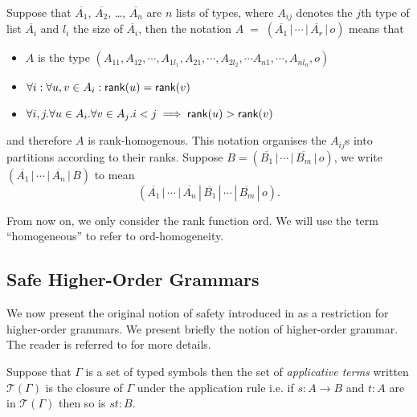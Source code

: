Suppose that $\overline{A_1}$, $\overline{A_2}$, \ldots,
$\overline{A_n}$ are $n$ lists of types, where $A_{ij}$ denotes the
$j$th type of list $\overline{A_i}$ and $l_i$ the size of
$\overline{A_i}$, then the notation $A \; = \; (\overline{A_1} \, |
\, \cdots \, | \, \overline{A_r} \, | \, o)$ means that
\begin{itemize}
  \item $A$ is the type $(A_{11},A_{12},\cdots, A_{1l_1}, A_{21}, \cdots,A_{2l_2}, \cdots A_{n1},\cdots, A_{nl_n},o)$
  \item $\forall i: \forall u,v \in A_i : {\sf rank}(u) = {\sf rank}(v) $
  \item $\forall i,j . \forall u \in A_i . \forall v \in A_j . i<j \implies {\sf rank}(u) >
   {\sf rank}(v) $
\end{itemize}
and therefore $A$ is {\sf rank}-homogenous. This notation organises
the $A_{ij}$s into partitions according to their ranks. Suppose $B =
(\overline{B_1} \, | \, \cdots \, | \, \overline{B_m} \, | \, o)$,
we write $(\overline{A_1} \, | \, \cdots \, | \, \overline{A_n} \, |
\, {B})$ to mean
\[(\overline{A_1} \, | \, \cdots \, | \, \overline{A_n} \, | \,
\overline{B_1} \, | \, \cdots \, | \, \overline{B_m} \, | \, o).\]

From now on, we only consider the rank function {\sf ord}. We will
use the term ``homogeneous'' to refer to {\sf ord}-homogeneity.


\subsection{Safe Higher-Order Grammars}
We now present the original notion of safety introduced in \cite{KNU02} as a restriction for higher-order grammars. We present briefly the notion of higher-order grammar. The reader is referred to \cite{KNU02,demirandathesis,safety-mirlong2004}
for more details.

Suppose that $\Gamma$ is a set of typed symbols then the set of \emph{applicative terms} written $\mathcal{T}(\Gamma)$ is the
closure of $\Gamma$ under the application rule i.e. if $s: A\rightarrow B$ and $t:A$ are in $\mathcal{T}(\Gamma)$ then so is $st :B$.

